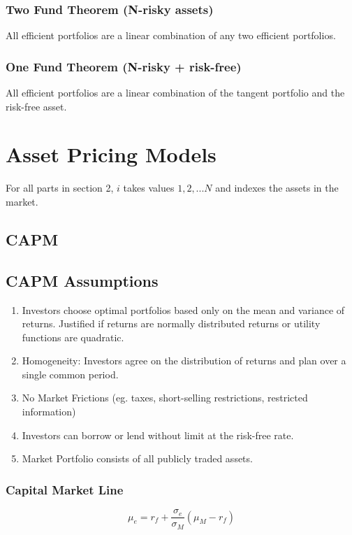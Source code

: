 \documentclass[11pt]{article}
\begin{document}
	\subsubsection{Two Fund Theorem (N-risky assets)}
	All efficient portfolios are a linear combination of any two efficient portfolios. 
	\subsubsection{One Fund Theorem (N-risky + risk-free)}
	All efficient portfolios are a linear combination of the tangent portfolio and the risk-free asset.
	
	\newpage
	\section{Asset Pricing Models}
	For all parts in section 2, \( i \) takes values \( 1,2,... N \) and indexes the assets in the market.
	\subsection{CAPM}
	\subsection{CAPM Assumptions}
	\begin{enumerate}
		\item Investors choose optimal portfolios based only on the mean and variance of returns. Justified if returns are normally distributed returns or utility functions are quadratic.
		\item Homogeneity: Investors agree on the distribution of returns and plan over a single common period.
		\item No Market Frictions (eg. taxes, short-selling restrictions, restricted information)
		\item Investors can borrow or lend without limit at the risk-free rate.
		\item Market Portfolio consists of all publicly traded assets.
	\end{enumerate}
	\subsubsection{Capital Market Line}
	\[	\mu_{e} = r_{f} + \frac{\sigma_{e}}{\sigma_{M}}(\mu_{M} - r_{f})\]
\end{document}
